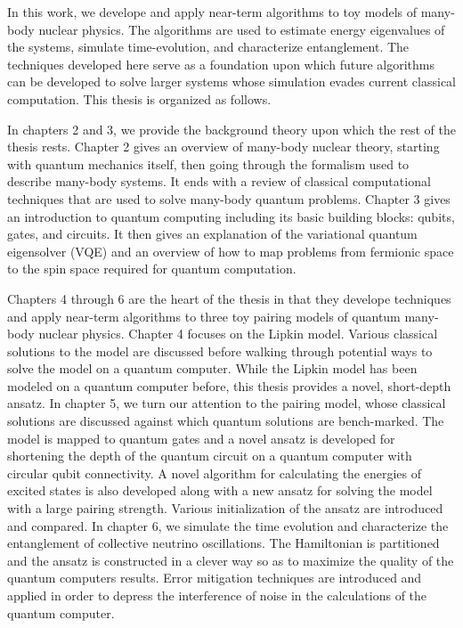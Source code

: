 \documentclass[Dual]{msu-thesis}
\begin{document}
In this work, we develope and apply near-term algorithms to toy models of many-body nuclear physics. The algorithms are used to estimate energy eigenvalues of the systems, simulate time-evolution, and characterize entanglement. The techniques developed here serve as a foundation upon which future algorithms can be developed to solve larger systems whose simulation evades current classical computation. This thesis is organized as follows.

In chapters 2 and 3, we provide the background theory upon which the rest of the thesis rests. Chapter 2 gives an overview of many-body nuclear theory, starting with quantum mechanics itself, then going through the formalism used to describe many-body systems. It ends with a review of classical computational techniques that are used to solve many-body quantum problems. Chapter 3 gives an introduction to quantum computing including its basic building blocks: qubits, gates, and circuits. It then gives an explanation of the variational quantum eigensolver (VQE) and an overview of how to map problems from fermionic space to the spin space required for quantum computation.

Chapters 4 through 6 are the heart of the thesis in that they develope techniques and apply near-term algorithms to three toy pairing models of quantum many-body nuclear physics. Chapter 4 focuses on the Lipkin model. Various classical solutions to the model are discussed before walking through potential ways to solve the model on a quantum computer. While the Lipkin model has been modeled on a quantum computer before, this thesis provides a novel, short-depth ansatz. In chapter 5, we turn our attention to the pairing model, whose classical solutions are discussed against which quantum solutions are bench-marked. The model is mapped to quantum gates and a novel ansatz is developed for shortening the depth of the quantum circuit on a quantum computer with circular qubit connectivity. A novel algorithm for calculating the energies of excited states is also developed along with a new ansatz for solving the model with a large pairing strength. Various initialization of the ansatz are introduced and compared. In chapter 6, we simulate the time evolution and characterize the entanglement of collective neutrino oscillations. The Hamiltonian is partitioned and the ansatz is constructed in a clever way so as to maximize the quality of the quantum computers results. Error mitigation techniques are introduced and applied in order to depress the interference of noise in the calculations of the quantum computer.
\end{document}
